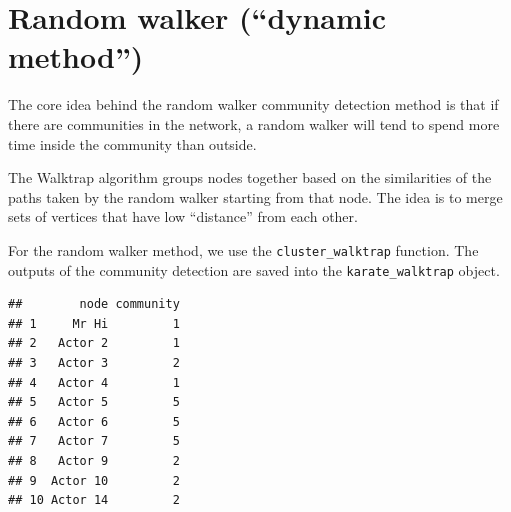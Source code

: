 \documentclass[
]{book}
\newenvironment{Shaded}{\begin{snugshade}}{\end{snugshade}}
\newcommand{\AttributeTok}[1]{\textcolor[rgb]{0.13,0.29,0.53}{#1}}
\newcommand{\CommentTok}[1]{\textcolor[rgb]{0.56,0.35,0.01}{\textit{#1}}}
\newcommand{\DecValTok}[1]{\textcolor[rgb]{0.00,0.00,0.81}{#1}}
\newcommand{\FunctionTok}[1]{\textcolor[rgb]{0.13,0.29,0.53}{\textbf{#1}}}
\newcommand{\NormalTok}[1]{#1}
\newcommand{\OtherTok}[1]{\textcolor[rgb]{0.56,0.35,0.01}{#1}}
\newcommand{\SpecialCharTok}[1]{\textcolor[rgb]{0.81,0.36,0.00}{\textbf{#1}}}
\begin{document}
\section{Random walker (``dynamic method'')}\label{random-walker-dynamic-method}

The core idea behind the random walker community detection method is that if there are communities in the network, a random walker will tend to spend more time inside the community than outside.

The Walktrap algorithm groups nodes together based on the similarities of the paths taken by the random walker starting from that node. The idea is to merge sets of vertices that have low ``distance'' from each other.

For the random walker method, we use the \texttt{cluster\_walktrap} function. The outputs of the community detection are saved into the \texttt{karate\_walktrap} object.

\begin{Shaded}
\end{Shaded}

\begin{verbatim}
##        node community
## 1     Mr Hi         1
## 2   Actor 2         1
## 3   Actor 3         2
## 4   Actor 4         1
## 5   Actor 5         5
## 6   Actor 6         5
## 7   Actor 7         5
## 8   Actor 9         2
## 9  Actor 10         2
## 10 Actor 14         2
\end{verbatim}

\begin{Shaded}
\end{Shaded}
\end{document}
